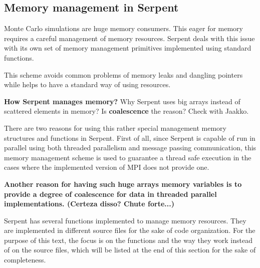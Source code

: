 \documentclass[twoside,a4paper,12pt,english,draft]{anstrans}
\begin{document}
\subsection{Memory management in Serpent}

Monte Carlo simulations are huge memory consumers. This eager for memory requires a careful
management of memory resources. Serpent deals with this issue with its own set of memory
management primitives implemented using standard functions.

This scheme avoids common problems of memory leaks and dangling pointers while helps to
have a standard way of using resources.

\textbf{How Serpent manages memory?}
Why Serpent uses big arrays instead of scattered elements in memory?
Is \textbf{coalescence} the reason? Check with Jaakko.

There are two reasons for using this rather special management memory
structures and functions in Serpent. First of all, since Serpent is
capable of run in parallel using both threaded parallelism and
message passing communication, this memory management scheme is
used to guarantee a thread safe execution in the cases where
the implemented version of MPI does not provide one.

\textbf{Another reason for having such huge arrays memory variables is to
provide a degree of coalescence for data in threaded parallel implementations.
(Certeza disso? Chute forte...)}

%

Serpent has several functions implemented to manage memory resources. They are implemented in different
source files for the sake of code organization. For the purpose of this text, the focus is on the functions
and the way they work instead of on the source files, which will be listed at the end of this section for
the sake of completeness.
\end{document}
